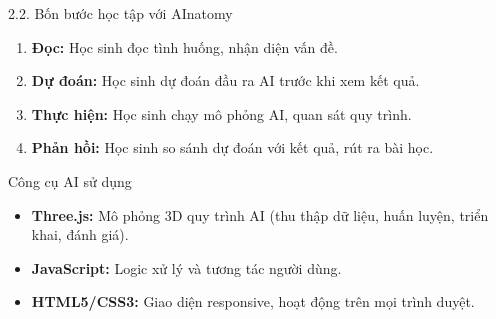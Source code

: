 \documentclass[10pt, aspectratio=169]{beamer}
\begin{document}
\begin{frame}{2.2. Bốn bước học tập với AInatomy}
    \begin{enumerate}
        \item \textbf{Đọc:} Học sinh đọc tình huống, nhận diện vấn đề.
        \item \textbf{Dự đoán:} Học sinh dự đoán đầu ra AI trước khi xem kết quả.
        \item \textbf{Thực hiện:} Học sinh chạy mô phỏng AI, quan sát quy trình.
        \item \textbf{Phản hồi:} Học sinh so sánh dự đoán với kết quả, rút ra bài học.
    \end{enumerate}
    
    \vspace{0.5em}
    
    \begin{block}{Công cụ AI sử dụng}
        \begin{itemize}
            \item \textbf{Three.js:} Mô phỏng 3D quy trình AI (thu thập dữ liệu, huấn luyện, triển khai, đánh giá).
            \item \textbf{JavaScript:} Logic xử lý và tương tác người dùng.
            \item \textbf{HTML5/CSS3:} Giao diện responsive, hoạt động trên mọi trình duyệt.
        \end{itemize}
    \end{block}
\end{frame}
\end{document}
